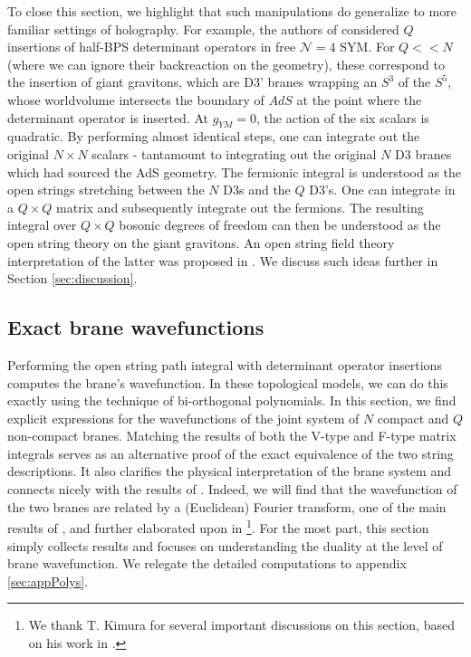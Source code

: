 \documentclass[english]{article}
\let\mc=\mathcal
\begin{document}
To close this section, we highlight that such manipulations do generalize to more familiar settings of holography. For example, the authors of \cite{komatsuOCO} considered $Q$ insertions of half-BPS determinant operators in free $\mc{N}=4$ SYM. For $Q<<N$ (where we can ignore their backreaction on the geometry), these correspond to the insertion of giant gravitons, which are D3' branes wrapping an $S^3$ of the $S^5$, whose worldvolume intersects the boundary of $AdS$ at the point where the determinant operator is inserted. At $g_{YM}=0$, the action of the six scalars is quadratic. By performing almost identical steps, one can integrate out the original $N \times N$ scalars - tantamount to integrating out the original $N$ D3 branes which had sourced the AdS geometry. The fermionic integral is understood as the open strings stretching between the $N$ D3s and the $Q$ D3's. One can integrate in a $Q \times Q$ matrix and subsequently integrate out the fermions. The resulting integral over $Q \times Q$ bosonic degrees of freedom can then be understood as the open string theory on the giant gravitons. An open string field theory interpretation of the latter was proposed in \cite{komatsuOCO}. We discuss such ideas further in Section \ref{sec:discussion}.

\subsection{Exact brane wavefunctions} \label{sec:exactwfns}

Performing the open string path integral with determinant operator insertions computes the brane's wavefunction. In these topological models, we can do this exactly using the technique of bi-orthogonal polynomials. In this section, we find explicit expressions for the wavefunctions of the joint system of $N$ compact and $Q$ non-compact branes. Matching the results of both the V-type and F-type matrix integrals serves as an alternative proof of the exact equivalence of the two string descriptions. It also clarifies the physical interpretation of the brane system and connects nicely with the results of \cite{Aganagic_2005}. Indeed, we will find that the wavefunction of the two branes are related by a (Euclidean) Fourier transform, one of the main results of \cite{Aganagic_2005}, and further elaborated upon in \cite{Kimura_2014}\footnote{We thank T. Kimura for several important discussions on this section, based on his work in \cite{Kimura_2014}.}. For the most part, this section simply collects results and focuses on understanding the duality at the level of brane wavefunction. We relegate the detailed computations to appendix \ref{sec:appPolys}. 
\end{document}
